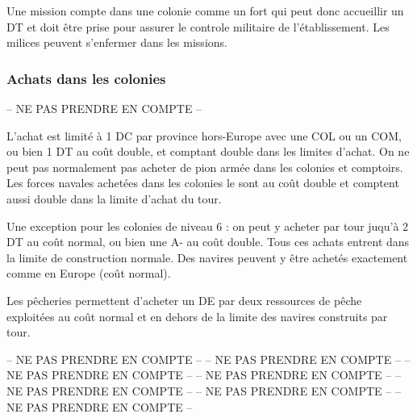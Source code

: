 Une mission compte dans une colonie comme un fort qui peut donc accueillir un DT
et doit être prise pour assurer le controle militaire de l'établissement.
Les milices peuvent s'enfermer dans les missions.

\subsubsection{Achats dans les colonies}
-- NE PAS PRENDRE EN COMPTE --

L'achat est limité à 1 DC par province hors-Europe avec une COL ou un COM, ou bien
1 DT au coût double, et comptant double dans les limites d'achat.
On ne peut pas normalement pas acheter de pion armée dans les colonies et comptoirs.
Les forces navales achetées dans les colonies le sont au coût double et
comptent aussi double dans la limite d'achat du tour.

Une exception pour les colonies de niveau 6 :
on peut y acheter par tour juqu'à 2 DT au coût normal, ou bien une
A- au coût double. Tous ces achats entrent dans la limite de construction normale.
Des navires peuvent y être achetés exactement comme en Europe (coût normal).

Les pêcheries permettent d'acheter un DE par deux ressources de pêche exploitées
au coût normal et en dehors de la limite des navires construits par tour.

-- NE PAS PRENDRE EN COMPTE --
-- NE PAS PRENDRE EN COMPTE --
-- NE PAS PRENDRE EN COMPTE --
-- NE PAS PRENDRE EN COMPTE --
-- NE PAS PRENDRE EN COMPTE --
-- NE PAS PRENDRE EN COMPTE --
-- NE PAS PRENDRE EN COMPTE --
